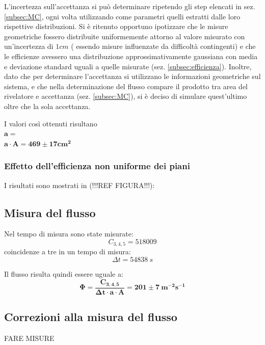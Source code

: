 \documentclass[11pt]{article}
\begin{document}
L'incertezza sull'accettanza si può determinare ripetendo gli step elencati in sez. \ref{subsec:MC}, ogni volta utilizzando come parametri quelli estratti dalle loro rispettive distribuzioni. Si è ritenuto opportuno ipotizzare che le misure geometriche fossero distribuite uniformemente attorno al valore misurato con un'incertezza di $1 cm$ ( essendo misure influenzate da difficoltà contingenti) e che le efficienze avessero una distribuzione approssimativamente gaussiana con media e deviazione standard uguali a quelle misurate (sez. \ref{subsec:efficienza}). Inoltre, dato che per determinare l'accettanza si utilizzano le informazioni geometriche sul sistema, e che nella determinazione del flusso compare il prodotto tra area del rivelatore e accettanza (sez. \ref{subsec:MC}), si è deciso di simulare quest'ultimo oltre che la sola accettanza.

I valori così ottenuti risultano \\
$
\mathbf{a = } 
$
\\
$
\mathbf{ a \cdot A =  469 \pm 17 cm^2}
$

\subsubsection{Effetto dell'efficienza non uniforme dei piani}

I risultati sono mostrati in (!!!REF FIGURA!!!): \\




\subsection{Misura del flusso}
Nel tempo di misura sono state misurate: \\
\begin{equation}
C_{3,4,5} = 518009
\nonumber
\end{equation}
coincidenze a tre in un tempo di misura: \\
\begin{equation}
\Delta t = 54838 \ s
\nonumber
\end{equation}

Il flusso risulta quindi essere uguale a: \\
\begin{equation}
\mathbf{\Phi = \frac{C_{3,4,5}}{\Delta t \cdot a \cdot A} = 201 \pm 7 \ m^{-2} s^{-1}} 
\nonumber
\end{equation}

\subsection{Correzioni alla misura del flusso}
FARE MISURE
\end{document}
